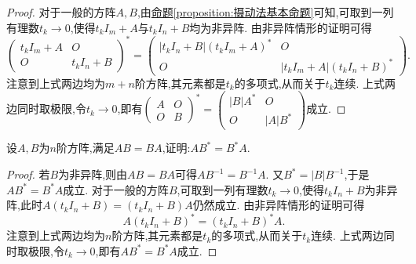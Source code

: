 \documentclass[../../main.tex]{subfiles}%
\begin{document}
\begin{proof}
对于一般的方阵\(A,B\),由\hyperref[proposition:摄动法基本命题]{命题\ref{proposition:摄动法基本命题}}可知,可取到一列有理数\(t_k\rightarrow0\),使得\(t_kI_m + A\)与\(t_kI_n + B\)均为非异阵. 由非异阵情形的证明可得
\[
\begin{pmatrix}
t_kI_m + A & O\\
O & t_kI_n + B
\end{pmatrix}^*=\begin{pmatrix}
|t_kI_n + B|(t_kI_m + A)^* & O\\
O & |t_kI_m + A|(t_kI_n + B)^*
\end{pmatrix}.
\]
注意到上式两边均为\(m + n\)阶方阵,其元素都是\(t_k\)的多项式,从而关于\(t_k\)连续. 上式两边同时取极限,令\(t_k\rightarrow0\),即有\(\begin{pmatrix}
A & O\\
O & B
\end{pmatrix}^*=\begin{pmatrix}
|B|A^* & O\\
O & |A|B^*
\end{pmatrix}\)成立.


\end{proof}

\begin{example}
设\(A,B\)为\(n\)阶方阵,满足\(AB = BA\),证明:\(AB^* = B^*A\).
\end{example}
\begin{proof}

若\(B\)为非异阵,则由\(AB = BA\)可得\(AB^{-1}=B^{-1}A\). 又\(B^* = |B|B^{-1}\),于是\(AB^* = B^*A\)成立. 对于一般的方阵\(B\),可取到一列有理数\(t_k\rightarrow0\),使得\(t_kI_n + B\)为非异阵,此时\(A(t_kI_n + B)=(t_kI_n + B)A\)仍然成立. 由非异阵情形的证明可得
\[
A(t_kI_n + B)^*=(t_kI_n + B)^*A.
\]
注意到上式两边均为\(n\)阶方阵,其元素都是\(t_k\)的多项式,从而关于\(t_k\)连续. 上式两边同时取极限,令\(t_k\rightarrow0\),即有\(AB^* = B^*A\)成立.

\end{proof}
\end{document}
